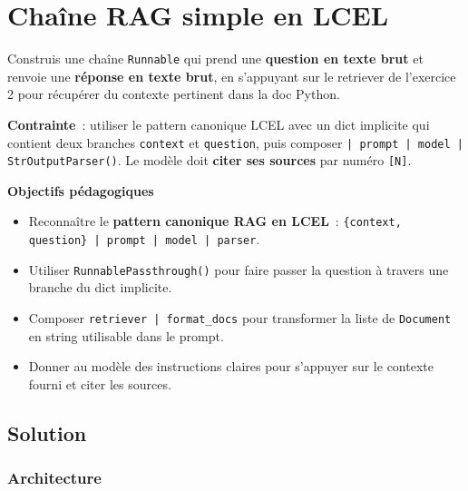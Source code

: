 \documentclass[11pt,a4paper]{article}
\begin{document}
\section{Chaîne RAG simple en LCEL}

\begin{tcolorbox}[title=Exercice 3. Composer un RAG end-to-end en LCEL]
Construis une chaîne \texttt{Runnable} qui prend une \textbf{question
en texte brut} et renvoie une \textbf{réponse en texte brut}, en
s'appuyant sur le retriever de l'exercice 2 pour récupérer du contexte
pertinent dans la doc Python.

\textbf{Contrainte}~: utiliser le pattern canonique LCEL avec un dict
implicite qui contient deux branches \texttt{context} et \texttt{question},
puis composer \texttt{| prompt | model | StrOutputParser()}. Le modèle
doit \textbf{citer ses sources} par numéro \texttt{[N]}.

\bigskip
\noindent\textbf{Objectifs pédagogiques}
\begin{itemize}[leftmargin=*]
  \item Reconnaître le \textbf{pattern canonique RAG en LCEL}~:
        \texttt{\{context, question\} | prompt | model | parser}.
  \item Utiliser \texttt{RunnablePassthrough()} pour faire passer la
        question à travers une branche du dict implicite.
  \item Composer \texttt{retriever | format\_docs} pour transformer la
        liste de \texttt{Document} en string utilisable dans le prompt.
  \item Donner au modèle des instructions claires pour s'appuyer sur
        le contexte fourni et citer les sources.
\end{itemize}
\end{tcolorbox}

\subsection{Solution}

\subsubsection{Architecture}
\end{document}
